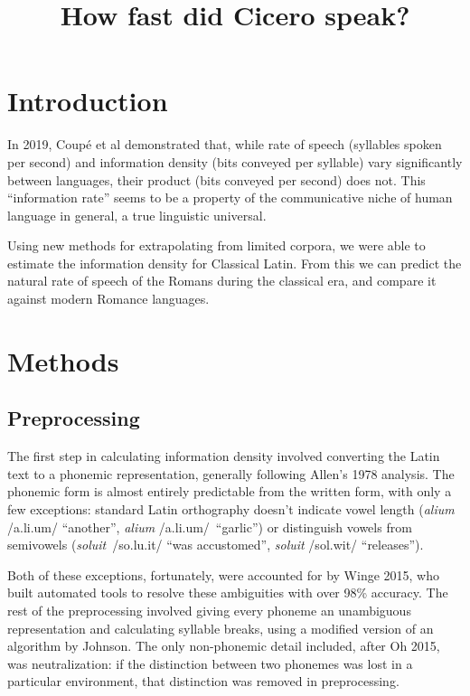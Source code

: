 \documentclass{article}
\title{How fast did Cicero speak?}
\date{}
\begin{document}
\maketitle

\section{Introduction}

In 2019, Coupé et al demonstrated that, while rate of speech (syllables spoken per second) and information density (bits conveyed per syllable) vary significantly between languages, their product (bits conveyed per second) does not. This ``information rate'' seems to be a property of the communicative niche of human language in general, a true linguistic universal.

Using new methods for extrapolating from limited corpora, we were able to estimate the information density for Classical Latin. From this we can predict the natural rate of speech of the Romans during the classical era, and compare it against modern Romance languages.

\section{Methods}

\subsection{Preprocessing}

The first step in calculating information density involved converting the Latin text to a phonemic representation, generally following Allen's 1978 analysis. The phonemic form is almost entirely predictable from the written form, with only a few exceptions: standard Latin orthography doesn't indicate vowel length (\emph{alium} /a.li.um/ ``another'', \emph{alium} /a\textlengthmark{}.li.um/ ``garlic'') or distinguish vowels from semivowels (\emph{soluit} /so.lu.it/ ``was accustomed'', \emph{soluit} /sol.wit/ ``releases'').

Both of these exceptions, fortunately, were accounted for by Winge 2015, who built automated tools to resolve these ambiguities with over 98\% accuracy. The rest of the preprocessing involved giving every phoneme an unambiguous representation and calculating syllable breaks, using a modified version of an algorithm by Johnson. The only non-phonemic detail included, after Oh 2015, was neutralization: if the distinction between two phonemes was lost in a particular environment, that distinction was removed in preprocessing.
\end{document}

